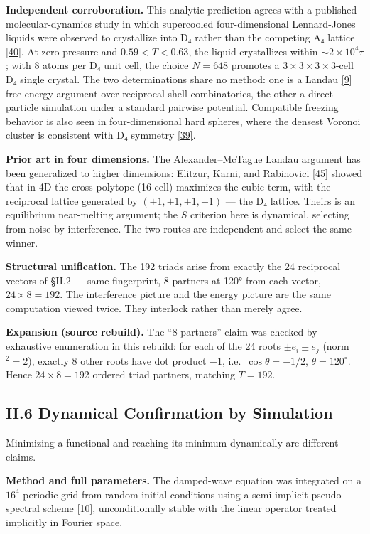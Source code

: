 \documentclass[a4paper,11pt]{article}
\newcommand{\expansion}[1]{\par\smallskip\noindent\textbf{Expansion (source rebuild).} #1\par\smallskip}
\begin{document}
\textbf{Independent corroboration.} This analytic prediction agrees with a published molecular-dynamics study in which supercooled four-dimensional Lennard-Jones liquids were observed to crystallize into D₄ rather than the competing A₄ lattice \hyperref[ref40]{[40]}. At zero pressure and $0.59<T<0.63$, the liquid crystallizes within ${\sim}2\times10^4\tau$; with 8 atoms per D₄ unit cell, the choice $N=648$ promotes a $3\times3\times3\times3$-cell D₄ single crystal. The two determinations share no method: one is a Landau \hyperref[ref9]{[9]} free-energy argument over reciprocal-shell combinatorics, the other a direct particle simulation under a standard pairwise potential. Compatible freezing behavior is also seen in four-dimensional hard spheres, where the densest Voronoi cluster is consistent with D₄ symmetry \hyperref[ref39]{[39]}.

\textbf{Prior art in four dimensions.} The Alexander–McTague Landau argument has been generalized to higher dimensions: Elitzur, Karni, and Rabinovici \hyperref[ref45]{[45]} showed that in 4D the cross-polytope (16-cell) maximizes the cubic term, with the reciprocal lattice generated by $(\pm1,\pm1,\pm1,\pm1)$ — the D₄ lattice. Theirs is an equilibrium near-melting argument; the $S$ criterion here is dynamical, selecting from noise by interference. The two routes are independent and select the same winner.

\textbf{Structural unification.} The 192 triads arise from exactly the 24 reciprocal vectors of §II.2 — same fingerprint, 8 partners at 120° from each vector, $24\times8=192$. The interference picture and the energy picture are the same computation viewed twice. They interlock rather than merely agree.


\expansion{The ``8 partners'' claim was checked by exhaustive enumeration in this rebuild: for each of the 24 roots $\pm e_i \pm e_j$ (norm$^2 = 2$), exactly 8 other roots have dot product $-1$, i.e.\ $\cos\theta = -1/2$, $\theta = 120^\circ$. Hence $24 \times 8 = 192$ ordered triad partners, matching $T = 192$.}
\subsection*{II.6 Dynamical Confirmation by Simulation}

Minimizing a functional and reaching its minimum dynamically are different claims.

\textbf{Method and full parameters.} The damped-wave equation was integrated on a $16^4$ periodic grid from random initial conditions using a semi-implicit pseudo-spectral scheme \hyperref[ref10]{[10]}, unconditionally stable with the linear operator treated implicitly in Fourier space.
\end{document}
